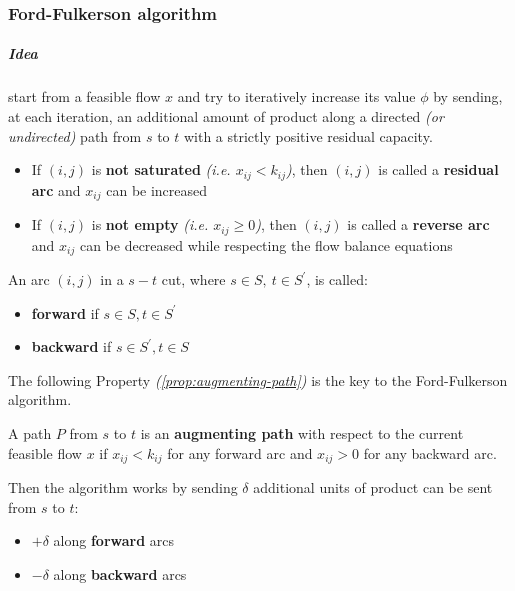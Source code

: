 \documentclass[english]{article}
\begin{document}
\subsubsection{Ford-Fulkerson algorithm}

\subparagraph*{Idea}
start from a feasible flow \(x\) and try to iteratively increase its value \(\phi\) by sending, at each iteration, an additional amount of product along a directed \textit{(or undirected)} path from \(s\) to \(t\) with a strictly positive residual capacity.

\begin{itemize}
  \item If \(\left( i, j \right)\) is \textbf{not saturated} \textit{(i.e. \(x_{ij} < k_{ij}\))}, then \(\left( i, j \right)\) is called a \textbf{residual arc} and \(x_{ij}\) can be increased
  \item If \(\left( i, j \right)\) is \textbf{not empty} \textit{(i.e. \(x_{ij} \geq 0\))}, then \(\left( i, j \right)\) is called a \textbf{reverse arc} and \(x_{ij}\) can be decreased while respecting the flow balance equations
\end{itemize}

\bigskip
An arc \(\left( i, j \right)\) in a \(s-t\) cut, where \(s \in S,\ t \in S^\prime\), is called:
\begin{itemize}
  \item \textbf{forward} if \(s \in S, t \in S^\prime\)
  \item \textbf{backward} if \(s \in S^\prime, t \in S\)
\end{itemize}

The following Property \textit{(\ref{prop:augmenting-path})} is the key to the Ford-Fulkerson algorithm.
\begin{property}
  A path \(P\) from \(s\) to \(t\) is an \textbf{augmenting path} with respect to the current feasible flow \(x\) if \(x_{ij} <k_{ij}\) for any forward arc and \(x_{ij} > 0\) for any backward arc.
  \label{prop:augmenting-path}
\end{property}

Then the algorithm works by sending \(\delta\) additional units of product can be sent from \(s\) to \(t\):

\begin{itemize}
  \item \(+\delta\) along \textbf{forward} arcs
  \item \(-\delta\) along \textbf{backward} arcs
\end{itemize}
\end{document}
